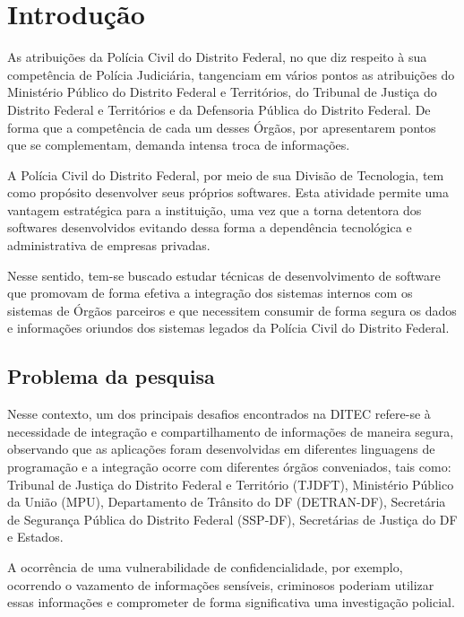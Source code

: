 \chapter{Introdução}\label{sec:introducao}
As atribuições da Polícia Civil do Distrito Federal, no que diz respeito à sua competência de Polícia Judiciária, tangenciam em vários pontos as atribuições do Ministério Público do Distrito Federal e Territórios, do Tribunal de Justiça do Distrito Federal e Territórios e da Defensoria Pública do Distrito Federal. De forma que a competência de cada um desses Órgãos, por apresentarem pontos que se complementam, demanda intensa troca de informações.

A Polícia Civil do Distrito Federal, por meio de sua Divisão de Tecnologia, tem como propósito desenvolver seus próprios softwares. Esta atividade permite uma vantagem estratégica para a instituição, uma vez que a torna detentora dos softwares desenvolvidos evitando dessa forma a dependência tecnológica e administrativa de empresas privadas.

Nesse sentido, tem-se buscado estudar técnicas de desenvolvimento de software que promovam de forma efetiva a integração dos sistemas internos com os sistemas de Órgãos parceiros e que necessitem consumir de forma segura os dados e informações oriundos dos sistemas legados da Polícia Civil do Distrito Federal.

\section{Problema da pesquisa}

Nesse contexto, um dos principais desafios encontrados na DITEC refere-se à necessidade de integração e compartilhamento de informações de maneira segura, observando que as aplicações foram desenvolvidas em diferentes linguagens de programação e a integração ocorre com diferentes órgãos conveniados, tais como: Tribunal de Justiça do Distrito Federal e Território (TJDFT), Ministério Público da União (MPU), Departamento de Trânsito do DF (DETRAN-DF), Secretária de Segurança Pública do Distrito Federal (SSP-DF), Secretárias de Justiça do DF e Estados.

A ocorrência de uma vulnerabilidade de confidencialidade, por exemplo, ocorrendo o vazamento de informações sensíveis, criminosos poderiam utilizar essas informações e comprometer de forma significativa uma investigação policial.

